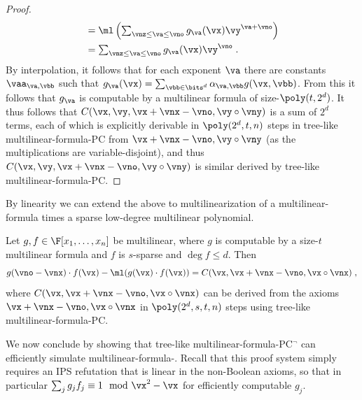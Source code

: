 \documentclass[11pt]{article}
\numberwithin{equation}{section}
\theoremstyle{definition}
\theoremstyle{plain}
\begin{document}
\begin{proof}
\begin{align*}
                &=\textstyle\ml\left(\sum_{\vnz\le\va\le \vno}g_\va(\vx)\vy^{\va+\vno}\right)\\
                &=\textstyle\sum_{\vnz\le\va\le \vno}g_\va(\vx)\vy^{\vno}
                \;.
        \end{align*}
        By interpolation, it follows that for each exponent $\va$ there are constants $\vaa_{\va,\vbb}$ such that $g_\va(\vx)=\sum_{\vbb\in\bits^d} \alpha_{\va,\vbb}g(\vx,\vbb)$.  From this it follows that $g_\va$ is computable by a multilinear formula of size-$\poly(t,2^d)$.  It thus follows that $C(\vx,\vy,\vx+\vnx-\vno,\vy\circ\vny)$ is a sum of $2^d$ terms, each of which is explicitly derivable in $\poly(2^d,t,n)$ steps in tree-like multilinear-formula-PC from $\vx+\vnx-\vno,\vy\circ\vny$ (as the multiplications are variable-disjoint), and thus $C(\vx,\vy,\vx+\vnx-\vno,\vy\circ\vny)$ is similar derived by tree-like multilinear-formula-PC\@.
\end{proof}

By linearity we can extend the above to multilinearization of a multilinear-formula times a sparse low-degree multilinear polynomial.

\begin{corollarywp}\label{res:mult-form-PC:form-sparse}
        Let $g,f\in\F[x_1,\ldots,x_n]$ be multilinear, where $g$ is computable by a size-$t$ multilinear formula and $f$ is $s$-sparse and $\deg f\le d$.  Then
        \[
                g(\vno-\vnx)\cdot f(\vx) - \ml(g(\vx)\cdot f(\vx))
                =C(\vx,\vx+\vnx-\vno,\vx\circ\vnx)
                \;,
        \]
        where $C(\vx,\vx+\vnx-\vno,\vx\circ\vnx)$ can be derived from the axioms $\vx+\vnx-\vno,\vx\circ\vnx$ in $\poly(2^d,s,t,n)$ steps using tree-like multilinear-formula-PC\@.
\end{corollarywp}

We now conclude by showing that tree-like multilinear-formula-PC$^\neg$ can efficiently simulate multilinear-formula-\lbIPS.  Recall that this proof system simply requires an IPS refutation that is linear in the non-Boolean axioms, so that in particular $\sum_j g_jf_j\equiv 1\mod \vx^2-\vx$ for efficiently computable $g_j$.
\end{document}
